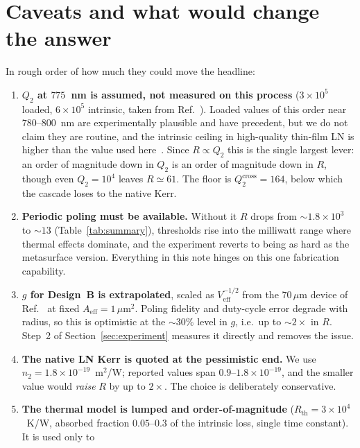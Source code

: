 \documentclass[11pt,a4paper]{article}
\newcommand{\Veff}{V_{\text{eff}}}
\newcommand{\Aeff}{A_{\text{eff}}}
\begin{document}
\section{Caveats and what would change the answer}\label{sec:caveats}

In rough order of how much they could move the headline:

\begin{enumerate}[leftmargin=1.8em,itemsep=3pt]
\item \textbf{$Q_2$ at $775$~nm is assumed, not measured on this
  process} ($3\times10^5$ loaded, $6\times10^5$ intrinsic, taken from
  Ref.~\cite{Lu2020}).  Loaded values of this order near $780$--$800$~nm
  are experimentally plausible and have precedent, but we do not claim
  they are routine, and the intrinsic ceiling in high-quality thin-film
  LN is higher than the value used here~\cite{Zhang2017}.  Since
  $R\propto Q_2$ this is the single largest lever: an order of magnitude
  down in $Q_2$ is an order of magnitude down in $R$, though even
  $Q_2=10^4$ leaves $R\simeq61$.  The floor is
  $Q_2^{\text{cross}}=164$, below which the cascade loses to the native
  Kerr.
\item \textbf{Periodic poling must be available.}  Without it
  $R$ drops from $\sim1.8\times10^3$ to $\sim13$
  (Table~\ref{tab:summary}), thresholds rise into the milliwatt range
  where thermal effects dominate, and the experiment reverts to being as
  hard as the metasurface version.  Everything in this note hinges on
  this one fabrication capability.
\item \textbf{$g$ for Design~B is extrapolated}, scaled as
  $\Veff^{-1/2}$ from the $70\,\mu$m device of Ref.~\cite{Lu2020} at
  fixed $\Aeff=1\,\mu$m$^2$.  Poling fidelity and duty-cycle error
  degrade with radius, so this is optimistic at the $\sim30\%$ level in
  $g$, i.e.\ up to $\sim2\times$ in $R$.  Step~2 of
  Section~\ref{sec:experiment} measures it directly and removes the
  issue.
\item \textbf{The native LN Kerr is quoted at the pessimistic end.}  We
  use $n_2=1.8\times10^{-19}$~m$^2$/W; reported values span
  $0.9$--$1.8\times10^{-19}$, and the smaller value would \emph{raise}
  $R$ by up to $2\times$.  The choice is deliberately conservative.
\item \textbf{The thermal model is lumped and order-of-magnitude}
  ($R_{\text{th}}=3\times10^4$~K/W, absorbed fraction $0.05$--$0.3$ of
  the intrinsic loss, single time constant).  It is used only to

\end{enumerate}
\end{document}
